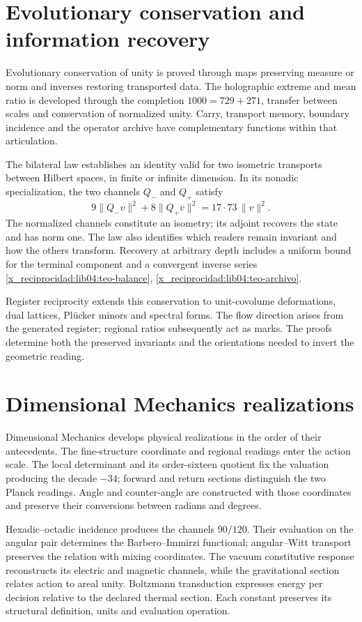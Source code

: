 \section*{Evolutionary conservation and information recovery}

Evolutionary conservation of unity is proved through maps preserving measure or norm and inverses restoring transported data. The holographic extreme and mean ratio is developed through the completion \(1000=729+271\), transfer between scales and conservation of normalized unity. Carry, transport memory, boundary incidence and the operator archive have complementary functions within that articulation.

The bilateral law establishes an identity valid for two isometric transports between Hilbert spaces, in finite or infinite dimension. In its nonadic specialization, the two channels \(Q_-\) and \(Q_+\) satisfy
\[
 9\|Q_-v\|^2+8\|Q_+v\|^2
 =17\cdot73\,\|v\|^2.
\]
The normalized channels constitute an isometry; its adjoint recovers the state and has norm one. The law also identifies which readers remain invariant and how the others transform. Recovery at arbitrary depth includes a uniform bound for the terminal component and a convergent inverse series \ref{x_reciprocidad:lib04:teo-balance}, \ref{x_reciprocidad:lib04:teo-archivo}.

Register reciprocity extends this conservation to unit-covolume deformations, dual lattices, Plücker minors and spectral forms. The flow direction arises from the generated register; regional ratios subsequently act as marks. The proofs determine both the preserved invariants and the orientations needed to invert the geometric reading.

\section*{Dimensional Mechanics realizations}

Dimensional Mechanics develops physical realizations in the order of their antecedents. The fine-structure coordinate and regional readings enter the action scale. The local determinant and its order-sixteen quotient fix the valuation producing the decade \(-34\); forward and return sections distinguish the two Planck readings. Angle and counter-angle are constructed with those coordinates and preserve their conversions between radians and degrees.

Hexadic--octadic incidence produces the channels \(90/120\). Their evaluation on the angular pair determines the Barbero--Immirzi functional; angular--Witt transport preserves the relation with mixing coordinates. The vacuum constitutive response reconstructs its electric and magnetic channels, while the gravitational section relates action to areal unity. Boltzmann transduction expresses energy per decision relative to the declared thermal section. Each constant preserves its structural definition, units and evaluation operation.

